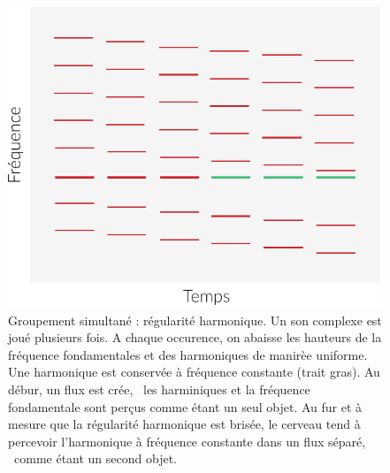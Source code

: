 \begin{figure}[bth]
        \myfloatalign
        \includegraphics[width=.5\linewidth]{gfx/harmo-eps-converted-to}
        \caption[Groupement simultané : régularité harmonique]{Groupement simultané : régularité harmonique. Un son complexe est joué plusieurs fois. A chaque occurence, on abaisse les hauteurs de la fréquence fondamentales et des harmoniques de manirèe uniforme. Une harmonique est conservée à fréquence constante (trait gras). Au débur, un flux est crée, \ie~les harminiques et la fréquence fondamentale sont perçus comme étant un seul objet. Au fur et à mesure que la régularité harmonique est brisée, le cerveau tend à percevoir l'harmonique à fréquence constante dans un flux séparé, \ie~comme étant un second objet.}\label{fig:harmo}
\end{figure}

